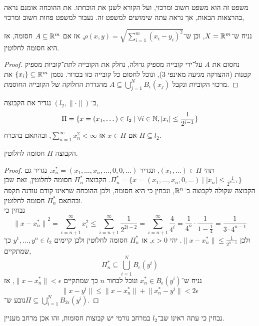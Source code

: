 משפט זה הוא משפט חשוב ומרכזי, ועל הקורא לשנן את הוכחתו. את ההוכחה אומנם נראה בהרצאות הבאות, אך נראה עתה שימושים למשפט זה.
נעבור למשפט פחות חשוב ומרכזי,
\begin{theorem}
	נניח ש־$X = \mathbb{R}^m$, וכן ש־$\rho(x, y) = \sqrt{\sum_{i = 1}^{m} {(x_i - y_i)}^2}$, אז אם $A \subseteq \mathbb{R}^m$ חסומה, אז היא חסומה לחלוטין.
\end{theorem}
\begin{proof}
	נחסום את $A$ על־ידי קובייה מספיק גדולה, נחלק את הקובייה לתת־קוביות מספיק קטנות (ההצדקה מגיעה מאינפי 3), ונוכל לחסום כל קובייה כזו בכדור.
	נסמן $\{ x_i \} \subseteq \mathbb{R}^m$ את מרכזי הקוביות ונקבל $A \subseteq \bigcup_{j = 1}^N B_\epsilon(x_j)$ מהגדרת החלוקה של הקובייה החוסמת.
\end{proof}
\begin{definition}
	ב־$(l_2, \lVert \cdot \rVert)$ נגדיר את הקבוצה,
	\[
		\Pi = \{ x = (x_1, \dots) \in l_2 \mid \forall i \in \mathbb{N}, |x_i| \le \frac{1}{2^{i - 1}} \}
	\]
	אם $x \in \Pi$ אז $\sum_{n = 1}^{\infty} x_n^2 < \infty$, ובהתאם בהכרח $\Pi \subseteq l_2$.
\end{definition}
\begin{theorem}
	הקבוצה $\Pi$ חסומה לחלוטין.
\end{theorem}
\begin{proof}
	תהי $(x_1, \dots) \in \Pi$, ונגדיר $x_n^* = (x_1, \dots, x_n, \dots, 0, 0, \dots)$.
	נגדיר גם $\Pi^*_n = \{ x = (x_1, \dots, x_n, 0, \dots) \mid |x_n| \le \frac{1}{2^{n - 1}} \}$.
	הקבוצה $\Pi_n^*$ חסומה לחלוטין, זאת שכן הקבוצה שקולה לקבוצה ב־$\mathbb{R}^n$, ונבחין כי היא חסומה, ולכן ההוכחה שראינו קודם עודנה תקפה ובהתאם $\Pi_n^*$ חסומה לחלוטין. \\
	נבחין כי
	\[
		{\lVert x - x_n^* \rVert}^2
		= \sum_{i = n + 1}^{\infty} x_i^2
		\le \sum_{i = n + 1}^{\infty} \frac{1}{2^{2i - 2}}
		= \sum_{i = n + 1}^{\infty} \frac{4}{4^i}
		= \frac{1}{4^n} \cdot \frac{1}{1 - \frac{1}{4}}
		= \frac{1}{3 \cdot 4^{n - 1}}
	\]
	ולכן $\lVert x - x_n^* \rVert \le \frac{1}{2^{n - 1}}$.
	יהי $\epsilon > 0$, אז $\Pi_n^*$ חסומה לחלוטין ולכן קיימים $y^1, \dots, y^n \in l_2$ כך שמתקיים,
	\[
		\Pi_n^* \subseteq \bigcup_{i = 1}^N B_\epsilon(y^i)
	\]
	נניח ש־$x_n^* \in B_\epsilon(y^i)$ ונוכל לבחור $n$ כך שמתקיים $\lVert x - x_n^* \rVert < \epsilon$, אז
	\[
		\lVert x - y^i \rVert
		\le \lVert x - x_n^* \rVert + \lVert x_n^* - y^i \rVert
		< 2 \epsilon
	\]
	נובע ש־$\Pi \subseteq \bigcup_{i = 1}^N B_{2\epsilon}(y^i)$.
\end{proof}
נבחין כי עתה ראינו שב־$l_2$ במרחב נורמי יש קבוצות חסומות, זהו אכן מרחב מעניין.

\listoftheorems[title=הגדרות ומשפטים,ignoreall,show={theorem,definition},swapnumber,onlynamed={proposition}]


